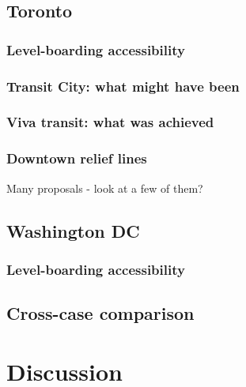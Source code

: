 \documentclass[]{tufte-book}
\begin{document}
\hypertarget{toronto}{%
\section{Toronto}\label{toronto}}

\hypertarget{level-boarding-accessibility-1}{%
\subsection{Level-boarding
accessibility}\label{level-boarding-accessibility-1}}

\hypertarget{transit-city-what-might-have-been}{%
\subsection{Transit City: what might have
been}\label{transit-city-what-might-have-been}}

\hypertarget{viva-transit-what-was-achieved}{%
\subsection{Viva transit: what was
achieved}\label{viva-transit-what-was-achieved}}

\hypertarget{downtown-relief-lines}{%
\subsection{Downtown relief lines}\label{downtown-relief-lines}}

Many proposals - look at a few of them?

\hypertarget{washington-dc}{%
\section{Washington DC}\label{washington-dc}}

\hypertarget{level-boarding-accessibility-2}{%
\subsection{Level-boarding
accessibility}\label{level-boarding-accessibility-2}}

\hypertarget{cross-case-comparison}{%
\section{Cross-case comparison}\label{cross-case-comparison}}

\hypertarget{discussion}{%
\chapter{Discussion}\label{discussion}}
\end{document}
